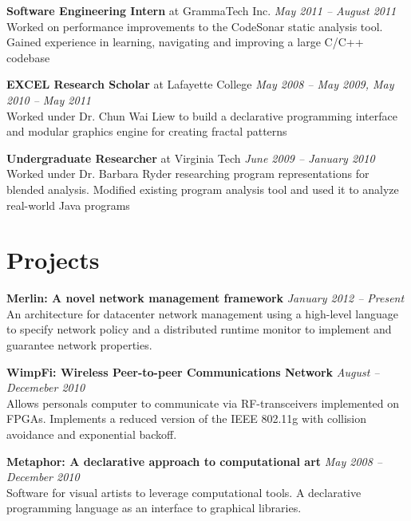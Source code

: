 \documentclass[margin,line]{resume}
\begin{document}
\begin{resume}
    {\bf Software Engineering Intern} at GrammaTech Inc. \hfill
    {\it May 2011 -- August 2011} \\
    Worked on performance improvements to the CodeSonar static analysis tool.
    Gained experience in learning, navigating and improving a large C/C++
    codebase

    {\bf EXCEL Research Scholar} at Lafayette College \hfill
    {\it May 2008 -- May 2009, May 2010 -- May 2011}\\
    Worked under Dr. Chun Wai Liew to build a declarative programming interface
    and modular graphics engine for creating fractal patterns

    {\bf Undergraduate Researcher} at Virginia Tech \hfill
    {\it June 2009 -- January 2010}\\
    Worked under Dr. Barbara Ryder researching program representations for
    blended analysis. Modified existing program analysis tool and used it to
    analyze real-world Java programs


    \section{Projects}
    {\bf Merlin: A novel network management framework} \hfill
    {\it January 2012 -- Present }\\
    An architecture for datacenter network management using a high-level
    language to specify network policy and a distributed runtime monitor to
    implement and guarantee network properties.


    {\bf WimpFi: Wireless Peer-to-peer Communications Network} \hfill
    {\it August -- Decemeber 2010}\\
    Allows personals computer to communicate via RF-transceivers implemented on
    FPGAs. Implements a reduced version of the IEEE 802.11g with collision
    avoidance and exponential backoff.

    {\bf Metaphor: A declarative approach to computational art} \hfill
    {\it May 2008 -- December 2010}\\
    Software for visual artists to leverage computational tools. A declarative
    programming language as an interface to graphical libraries.


\end{resume}
\end{document}
